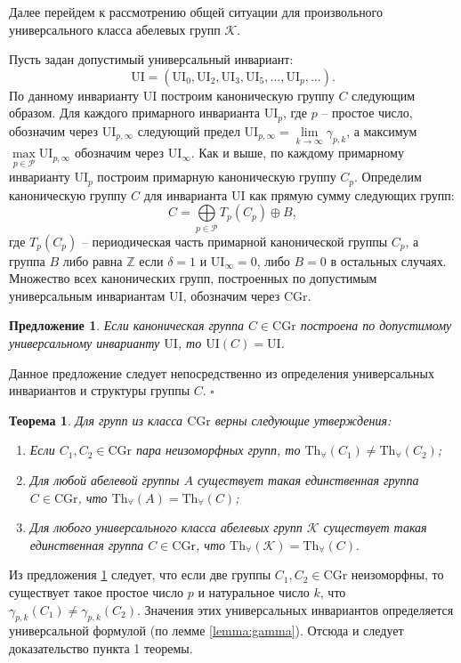 \documentclass[a4paper,11pt,twoside]{article}
\newtheorem{theorem}{Теорема}[section]
\newtheorem{proposition}{Предложение}[section]
\def\proof{{\noindent{\bf Доказательство.}} }
\def\K{{\mathcal{K}}}
\def\P{{\mathcal{P}}}
\def\Z{{\mathbb{Z}}}
\def\Tha{{\mathrm{Th}_\forall}}
\def\CG{{\mathrm{CGr}}}
\def\ui{{\mathrm{UI}}}
\begin{document}
Далее перейдем к рассмотрению общей ситуации для произвольного универсального класса абелевых групп $\K$.

Пусть задан допустимый универсальный инвариант:
$$\ui = (\ui_0, \ui_2, \ui_3, \ui_5, \ldots, \ui_p, \ldots).$$ 
По данному инварианту $\ui$ построим каноническую группу $C$ следующим образом. Для каждого примарного инварианта $\ui_p$, где $p$ -- простое число, обозначим через $\ui_{p,\infty}$ следующий предел $\ui_{p,\infty} = \lim\limits_{k \rightarrow \infty} \gamma_{p,k}$, а максимум $\max\limits_{p \in \P} \ui_{p, \infty}$ обозначим через $\ui_\infty$. Как и выше, по каждому примарному инварианту $\ui_p$ построим примарную каноническую группу $C_p$. Определим каноническую группу $C$ для инварианта $\ui$ как прямую сумму следующих групп:
$$C = \bigoplus\limits_{p \in \P} T_p(C_p) \oplus B,$$
где $T_p(C_p)$ -- периодическая часть примарной канонической группы $C_p$, а группа $B$ либо равна $\Z$ если $\delta = 1$ и $\ui_\infty = 0$, либо $B = 0$ в остальных случаях. Множество всех канонических групп, построенных по допустимым универсальным инвариантам $\ui$, обозначим через $\CG$.

\begin{proposition}\label{prop:UnivEnvForCannonicalGroup2}
Если каноническая группа $C \in \CG$ построена по допустимому универсальному инварианту $\ui$, то $\ui(C) = \ui$.
\end{proposition}
\proof Данное предложение следует непосредственно из определения универсальных инвариантов и структуры группы $C$. $\square$


\begin{theorem}\label{th:CannonicalGroupsAll}
Для групп из класса $\CG$ верны следующие утверждения:
\begin{enumerate}
\item Если $C_1, C_2 \in \CG$ пара неизоморфных групп, то $\Tha(C_1) \neq \Tha(C_2)$;
\item Для любой абелевой группы $A$ существует такая единственная группа $C \in \CG$, что $\Tha(A) = \Tha(C)$;
\item Для любого универсального класса абелевых групп $\K$ существует такая единственная группа $C \in \CG$, что $\Tha(\K) = \Tha(C).$
\end{enumerate}
\end{theorem}

\proof Из предложения \ref{prop:UnivEnvForCannonicalGroup2} следует, что если две группы $C_1, C_2 \in \CG$ неизоморфны, то существует такое простое число $p$ и натуральное число $k$, что $\gamma_{p,k}(C_1) \neq \gamma_{p,k}(C_2)$. Значения этих универсальных инвариантов определяется универсальной формулой (по лемме \ref{lemma:gamma}). Отсюда и следует доказательство пункта 1 теоремы.
\end{document}
